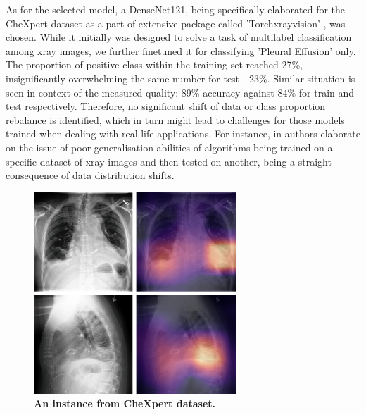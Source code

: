 \documentclass{article}
\begin{document}
As for the selected model, a DenseNet121, being specifically elaborated for the CheXpert dataset as a part of extensive package called 'Torchxrayvision' \cite{cohen2020limits}\cite{Cohen2022xrv}, was chosen. While it initially was designed to solve a task of multilabel classification among xray images, we further finetuned it for classifying 'Pleural Effusion' only. The proportion of positive class within the training set reached 27\%, insignificantly overwhelming the same number for test - 23\%. Similar situation is seen in context of the measured quality: 89\% accuracy against 84\% for train and test respectively. Therefore, no significant shift of data or class proportion rebalance is identified, which in turn might lead to challenges for those models trained when dealing with real-life applications. For instance, in \cite{joseph_d__viviano__2019} authors elaborate on the issue of poor generalisation abilities of algorithms being trained on a specific dataset of xray images and then tested on another, being a straight consequence of data distribution shifts.

\begin{figure}
	\advance\leftskip-0.5cm
	\includegraphics[width=3in]{img/chexpert.jpg}
	\caption{{\bf An instance from CheXpert dataset.}}
	\label{fig:chexpert_example}
\end{figure} 
\end{document}
